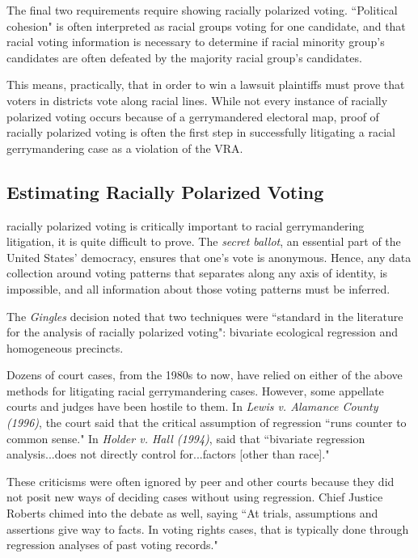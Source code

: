 The final two requirements require showing racially polarized voting. ``Political cohesion" is often interpreted as racial groups voting for one candidate, and that racial voting information is necessary to determine if racial minority group's candidates are often defeated by the majority racial group's candidates.

This means, practically, that in order to win a lawsuit plaintiffs must prove that voters in districts vote along racial lines. While not every instance of racially polarized voting occurs because of a gerrymandered electoral map, proof of racially polarized voting is often the first step in successfully litigating a racial gerrymandering case as a violation of the VRA.

\subsection{Estimating Racially Polarized Voting}

 racially polarized voting is critically important to racial gerrymandering litigation, it is quite difficult to prove. The \textit{secret ballot}, an essential part of the United States' democracy, ensures that one's vote is anonymous. Hence, any data collection around voting patterns that separates along any axis of identity, is impossible, and all information about those voting patterns must be inferred.

The \textit{Gingles} decision noted that two techniques were ``standard in the literature for the analysis of racially polarized voting"\cite{thornburg}: bivariate ecological regression and homogeneous precincts.

Dozens of court cases, from the 1980s to now, have relied on either of the above methods for litigating racial gerrymandering cases\cite{greiner}. However, some appellate courts and judges have been hostile to them. In \textit{Lewis v. Alamance County (1996)}\cite{Lewis_Alamance}, the court said that the critical assumption of regression ``runs counter to common sense." In \textit{Holder v. Hall (1994)}\cite{Holder_Hall}, said that ``bivariate regression analysis...does not directly control for...factors [other than race]."

These criticisms were often ignored by peer and other courts because they did not posit new ways of deciding cases without using regression. Chief Justice Roberts chimed into the debate as well, saying ``At trials, assumptions and assertions give way to facts. In voting rights cases, that is typically done through regression analyses of past voting records."\cite{LULAC}

